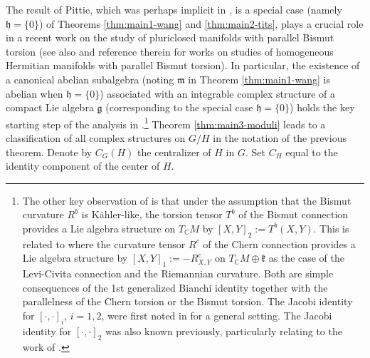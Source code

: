 \documentclass{amse-new}
\numberwithin{equation}{section} %
\begin{document}
The result of Pittie, which was perhaps implicit in \cite{Samelson}, is a
special case (namely $\mathfrak{h}=\{0\}$) of Theorems \ref{thm:main1-wang}
and \ref{thm:main2-tits}, plays a crucial role in a recent work \cite{BPT} on
the study of pluriclosed manifolds with parallel Bismut torsion (see also
\cite{PZ} and reference therein for works on studies of homogeneous Hermitian
manifolds with parallel Bismut torsion). In particular, the existence of a
canonical abelian subalgebra (noting $\mathfrak{m}$ in Theorem
\ref{thm:main1-wang} is abelian when $\mathfrak{h}=\{0\}$) associated with an
integrable complex structure of a compact Lie algebra $\mathfrak{g}$
(corresponding to the special case $\mathfrak{h}=\{0\}$) holds the key
starting step of the analysis in \cite{BPT}.\footnote{The other key
observation of \cite{BPT}
is that under the assumption that the Bismut curvature $R^b$ is K\"ahler-like, the
torsion tensor $T^b$ of the Bismut connection provides a Lie algebra
structure on $T_{\mathbb{C}}M$ by $[X, Y]_2:=T^b(X, Y)$. This is related to  \cite{NZ2} where
the curvature tensor  $ R^c$ of the Chern connection provides a Lie algebra structure by $[X, Y]_1:=-R^c_{X, Y}$ on  $T_{\mathbb{C}}M\oplus \mathfrak{k}$ as the case of the Levi-Civita connection and the Riemannian curvature. Both are simple consequences of the 1st generalized Bianchi identity together with the parallelness of the  Chern torsion or the Bismut torsion.  The Jacobi identity for $[\cdot, \cdot]_i$, $i=1, 2$,  were first noted in  \cite{Nomizu} for a general setting. The Jacobi identity for $[\cdot, \cdot]_2$  was also known previously, particularly relating to the work of \cite{Agri, AFF, Ziller}. } Theorem \ref{thm:main3-moduli} leads to a classification of all
complex structures on $G/H$ in the notation of the previous theorem. Denote by
$C_{G}(H)$ the centralizer of $H$ in $G$. Set $C_{H}$ equal to the identity
component of the center of $H$.
\end{document}
